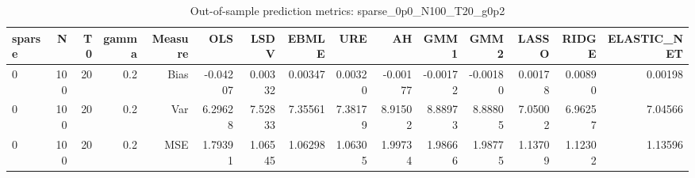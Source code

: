 \begin{table}[!htbp]\centering
\caption{Out-of-sample prediction metrics: sparse_0p0_N100_T20_g0p2}
\label{tab:table3_sparse_0p0_N100_T20_g0p2}
\begin{tabular}{lrrrrrrrrrrrrrr}
\hline
sparse & N & T0 & gamma & Measure & OLS & LSDV & EBMLE & URE & AH & GMM1 & GMM2 & LASSO & RIDGE & ELASTIC_NET \\
\hline
0 & 100 & 20 & 0.2 & Bias & -0.04207 & 0.00332 & 0.00347 & 0.00320 & -0.00177 & -0.00172 & -0.00180 & 0.00178 & 0.00890 & 0.00198 \\
0 & 100 & 20 & 0.2 & Var & 6.29628 & 7.52833 & 7.35561 & 7.38179 & 8.91502 & 8.88973 & 8.88805 & 7.05002 & 6.96257 & 7.04566 \\
0 & 100 & 20 & 0.2 & MSE & 1.79391 & 1.06545 & 1.06298 & 1.06305 & 1.99734 & 1.98666 & 1.98775 & 1.13709 & 1.12302 & 1.13596 \\
\hline
\end{tabular}
\end{table}

